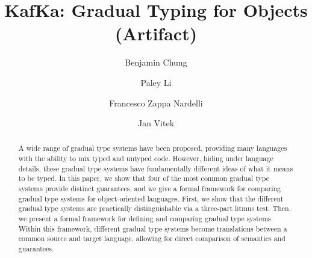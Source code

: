 \documentclass[a4paper,UKenglish]{darts-v2018}
\title{KafKa: Gradual Typing for Objects (Artifact)}%
\author{Benjamin Chung}{Northeastern University}{}{}{}%
\author{Paley Li}{Czech Technical University}{}{}{}
\author{Francesco Zappa Nardelli }{INRIA}{}{}{}
\author{Jan Vitek}{Northeastern University}{}{}{}
\begin{document}
\maketitle

\begin{abstract}
A wide range of gradual type systems have been proposed, providing many
languages with the ability to mix typed and untyped code. However, hiding
under language details, these gradual type systems have fundamentally
different ideas of what it means to be typed. In this paper, we show that
four of the most common gradual type systems provide distinct guarantees,
and we give a formal framework for comparing gradual type systems for
object-oriented languages. First, we show that the different gradual type
systems are practically distinguishable via a three-part litmus test. Then,
we present a formal framework for defining and comparing gradual type
systems. Within this framework, different gradual type systems become
translations between a common source and target language, allowing for
direct comparison of semantics and guarantees.
\end{abstract}


\end{document}
